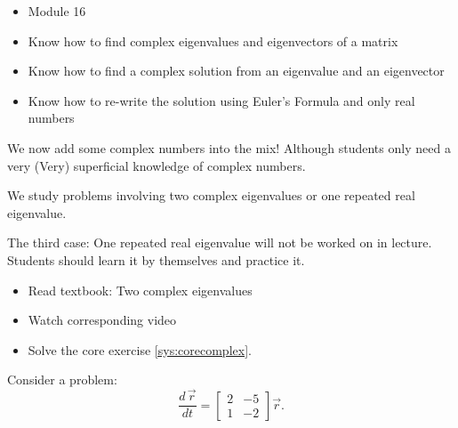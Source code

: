\bookonlynewpage
\begin{lesson}

	\begin{itemize}
		\item Module 16
	\end{itemize}

	\begin{itemize}
		\item Know how to find complex eigenvalues and eigenvectors of a matrix
		\item Know how to find a complex solution from an eigenvalue and an eigenvector
		\item Know how to re-write the solution using Euler's Formula and only real numbers
	\end{itemize}
	

We now add some complex numbers into the mix! Although students only need a very (Very) superficial knowledge of complex numbers. 

We study problems involving two complex eigenvalues or one repeated real eigenvalue. 

The third case: One repeated real eigenvalue will not be worked on in lecture. Students should learn it by themselves and practice it.

\begin{itemize}
	\item Read textbook: Two complex eigenvalues
	\item Watch corresponding video
	\item Solve the core exercise \ref{sys:corecomplex}.
\end{itemize}

\end{lesson}




\begin{annotation}
\begin{goals}
\end{goals}
\end{annotation}
\question \label{sys:corecomplex}
Consider a problem:
$$
\frac{d \,\vec{r}}{dt} = \begin{bmatrix} 2 & -5 \\ 1 & -2\end{bmatrix} \vec{r}.
$$
	
